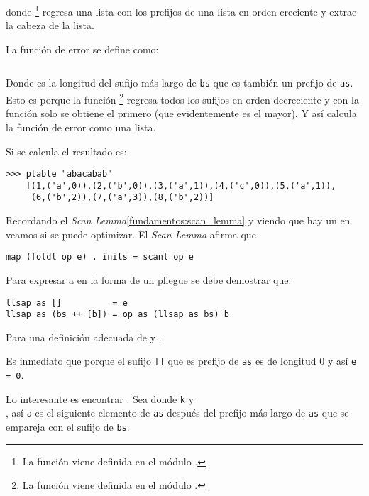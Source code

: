donde \footnote{
    La función  viene definida en el módulo .
    }
regresa una lista con los prefijos de una lista en orden creciente y  extrae la cabeza
de la lista.

La función de error se define como:
\inputminted[fontsize=\small]{haskell}{codigo/haskell/FailureFunctionNaive.hs}

Donde  es la longitud del sufijo más largo de \texttt{bs} que es también un
prefijo de \texttt{as}. Esto es porque la función \footnote{
    La función  viene definida en el módulo .
    }
regresa todos los sufijos en orden decreciente y con la función  solo se obtiene el
primero (que evidentemente es el mayor). Y así  calcula la función de error como
una lista.

Si se calcula  el resultado es:
\begin{verbatim}
>>> ptable "abacabab"
    [(1,('a',0)),(2,('b',0)),(3,('a',1)),(4,('c',0)),(5,('a',1)),
     (6,('b',2)),(7,('a',3)),(8,('b',2))]
\end{verbatim}

Recordando el \textit{Scan Lemma}\ref{fundamentos:scan_lemma} y viendo que hay un  en
 veamos si se puede optimizar. El \textit{Scan Lemma} afirma que
\begin{verbatim}
map (foldl op e) . inits = scanl op e
\end{verbatim}

Para expresar a  en la forma de un pliegue  se debe
demostrar que: %

\begin{verbatim}
llsap as []          = e
llsap as (bs ++ [b]) = op as (llsap as bs) b
\end{verbatim}
Para una definición adecuada de  y . 

Es inmediato que  porque el sufijo \texttt{[]} que es prefijo de
\texttt{as} es de longitud 0 y así \texttt{e = 0}.

Lo interesante es encontrar . Sea donde \texttt{k} y\\
, así \texttt{a} es el siguiente elemento de \texttt{as} después del
prefijo más largo de \texttt{as} que se empareja con el sufijo de \texttt{bs}.

